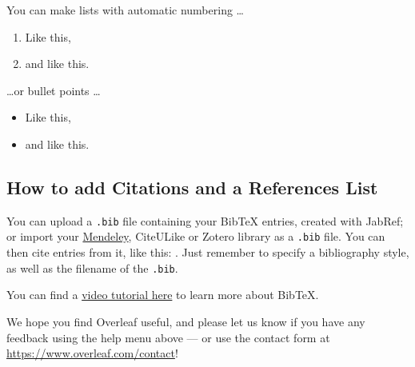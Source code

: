 \documentclass[a4paper]{article}
\begin{document}
You can make lists with automatic numbering \dots

\begin{enumerate}
\item Like this,
\item and like this.
\end{enumerate}
\dots or bullet points \dots
\begin{itemize}
\item Like this,
\item and like this.
\end{itemize}

\subsection{How to add Citations and a References List}

You can upload a \verb|.bib| file containing your BibTeX entries, created with JabRef; or import your \href{https://www.overleaf.com/blog/184}{Mendeley}, CiteULike or Zotero library as a \verb|.bib| file. You can then cite entries from it, like this: \cite{greenwade93}. Just remember to specify a bibliography style, as well as the filename of the \verb|.bib|.

You can find a \href{https://www.overleaf.com/help/97-how-to-include-a-bibliography-using-bibtex}{video tutorial here} to learn more about BibTeX.

We hope you find Overleaf useful, and please let us know if you have any feedback using the help menu above --- or use the contact form at \url{https://www.overleaf.com/contact}!




\end{document}
